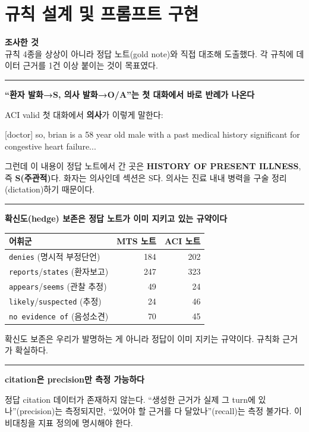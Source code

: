 \documentclass[10.5pt,a4paper]{article}
\newcommand{\investigated}[1]{%
\begin{tcolorbox}[enhanced, blank, breakable,
  borderline west={2.2pt}{0pt}{rulegray},
  left=10pt, right=0pt, top=2pt, bottom=2pt, before skip=6pt, after skip=10pt]
{\footnotesize\bfseries\color{navy}조사한 것}\\[2pt]#1
\end{tcolorbox}}
\newcommand{\finding}[1]{%
\par\vspace{0.9em}\noindent
\textcolor{navy}{\rule[-0.05em]{2.4pt}{0.82em}}\hspace{0.55em}\textbf{#1}\par\nobreak\vspace{0.15em}}
\newcommand{\subhead}[1]{\par\vspace{1.0em}{\bfseries\color{navy}#1}\par\vspace{-0.15em}}
\begin{document}
\section{규칙 설계 및 프롬프트 구현}

\investigated{규칙 4종을 상상이 아니라 정답 노트(gold note)와 직접 대조해 도출했다. 각 규칙에 데이터 근거를 1건 이상 붙이는 것이 목표였다.}

\subhead{확인된 사실}

\finding{``환자 발화→S, 의사 발화→O/A''는 첫 대화에서 바로 반례가 나온다}

ACI valid 첫 대화에서 \textbf{의사}가 이렇게 말한다:

{\small\ttfamily\color{navy}[doctor] so, brian is a 58 year old male with a past medical history significant for congestive heart failure...}

그런데 이 내용이 정답 노트에서 간 곳은 \textbf{HISTORY OF PRESENT ILLNESS}, 즉 \textbf{S(주관적)}다. 화자는 의사인데 섹션은 S다. 의사는 진료 내내 병력을 구술 정리(dictation)하기 때문이다.

\finding{확신도(hedge) 보존은 정답 노트가 이미 지키고 있는 규약이다}

\begin{center}\small
\begin{tabular}{@{}lrr@{}}
\toprule
\textbf{어휘군} & \textbf{MTS 노트} & \textbf{ACI 노트} \\
\midrule
\texttt{denies} (명시적 부정단언) & 184 & 202 \\
\texttt{reports}/\texttt{states} (환자보고) & 247 & 323 \\
\texttt{appears}/\texttt{seems} (관찰 추정) & 49 & 24 \\
\texttt{likely}/\texttt{suspected} (추정) & 24 & 46 \\
\texttt{no evidence of} (음성소견) & 70 & 45 \\
\bottomrule
\end{tabular}
\end{center}

확신도 보존은 우리가 발명하는 게 아니라 정답이 이미 지키는 규약이다. 규칙화 근거가 확실하다.

\finding{citation은 precision만 측정 가능하다}

정답 citation 데이터가 존재하지 않는다. ``생성한 근거가 실제 그 turn에 있나''(precision)는 측정되지만, ``있어야 할 근거를 다 달았나''(recall)는 측정 불가다. 이 비대칭을 지표 정의에 명시해야 한다.
\end{document}
